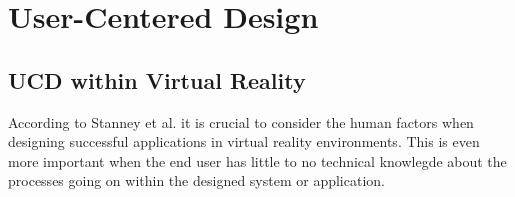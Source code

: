 \section{User-Centered Design}
\subsection{UCD within Virtual Reality}
According to Stanney et al. it is crucial to consider the human factors when designing successful applications in virtual reality environments. This is even more important when the end user has little to no technical knowlegde about the processes going on within the designed system or application.
\cite{UCD:stanney1998human}
